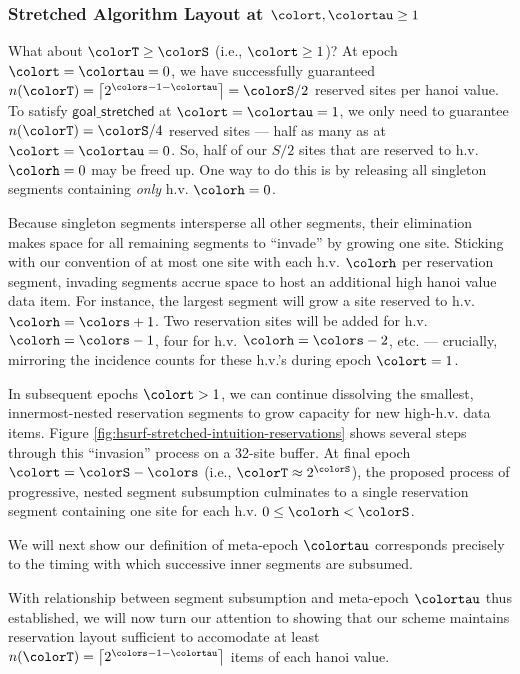 \subsubsection{Stretched Algorithm Layout at $\colort,\colortau\geq1$}

What about $\colorT \geq \colorS$ (i.e., $\colort \geq 1$)?
At epoch $\colort=\colortau=0$, we have successfully guaranteed $n(\colorT) = \left\lceil2^{\colors - 1 - \colortau}\right\rceil = \colorS / 2$ reserved sites per hanoi value.
To satisfy $\textsf{goal\_stretched}$ at $\colort=\colortau=1$, we only need to guarantee $n(\colorT) = \colorS/4$ reserved sites --- half as many as at $\colort=\colortau=0$.
So, half of our $S/2$ sites that are reserved to h.v. $\colorh=0$ may be freed up.
One way to do this is by releasing all singleton segments containing \textit{only} h.v. $\colorh=0$.

Because singleton segments intersperse all other segments, their elimination makes space for all remaining segments to ``invade'' by growing one site.
Sticking with our convention of at most one site with each h.v. $\colorh$ per reservation segment, invading segments accrue space to host an additional high hanoi value data item.
For instance, the largest segment will grow a site reserved to h.v. $\colorh=\colors +1$.
Two reservation sites will be added for h.v. $\colorh=\colors - 1$, four for h.v. $\colorh=\colors - 2$, etc. --- crucially, mirroring the incidence counts for these h.v.'s during epoch $\colort=1$.

In subsequent epochs $\colort>1$, we can continue dissolving the smallest, innermost-nested reservation segments to grow capacity for new high-h.v. data items.
Figure \ref{fig:hsurf-stretched-intuition-reservations} shows several steps through this ``invasion'' process on a 32-site buffer.
At final epoch $\colort=\colorS-\colors$ (i.e., $\colorT \approx 2^{\colorS}$), the proposed process of progressive, nested segment subsumption culminates to a single reservation segment containing one site for each h.v. $0 \leq \colorh < \colorS$.

We will next show our definition of meta-epoch $\colortau$ corresponds precisely to the timing with which successive inner segments are subsumed.



With relationship between segment subsumption and meta-epoch $\colortau$ thus established, we will now turn our attention to showing that our scheme maintains reservation layout sufficient to accomodate at least $n(\colorT) = \left\lceil 2^{\colors - 1 - \colortau} \right\rceil$ items of each hanoi value.

